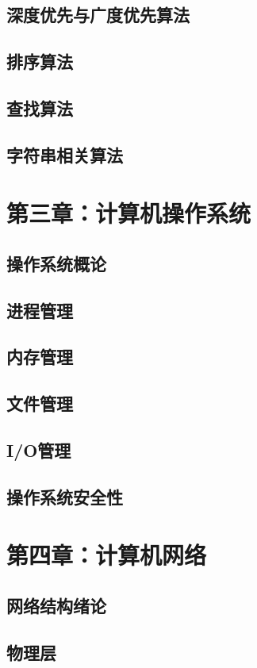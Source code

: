 \documentclass[UTF8]{article}
\begin{document}
        \subsection{深度优先与广度优先算法}
        \subsection{排序算法}
        \subsection{查找算法}
        \subsection{字符串相关算法}
    \newpage
    \section{第三章：计算机操作系统}
        \subsection{操作系统概论}
        \subsection{进程管理}
        \subsection{内存管理}
        \subsection{文件管理}
        \subsection{I/O管理}
        \subsection{操作系统安全性}

    \newpage
    \section{第四章：计算机网络}
        \subsection{网络结构绪论}
        \subsection{物理层}
\end{document}
